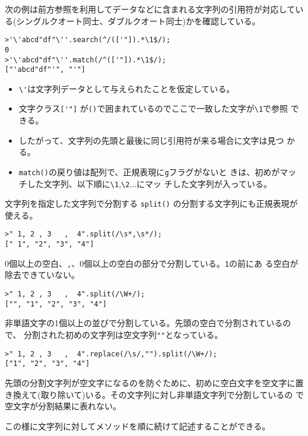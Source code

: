 \begin{Exec}
\iffalse\else
次の例は前方参照を利用してデータなどに含まれる文字列の引用符が対応してい
 る(シングルクオート同士、ダブルクオート同士)かを確認している。
\begin{verbatim}
>'\'abcd"df"\''.search(^/(['"]).*\1$/);
0
>'\'abcd"df"\''.match(/^(['"]).*\1$/);
["'abcd"df"'", "'"]
\end{verbatim}
\begin{itemize}
 \item \verb+\'+は文字列データとして与えられたことを仮定している。
 \item 文字クラス\verb+['"]+%
       が\verb+()+で囲まれているのでここで一致した文字が\verb+\1+で参照
       できる。
 \item したがって、文字列の先頭と最後に同じ引用符が来る場合に文字は見つ
       かる。
 \item \verb+match()+の戻り値は配列で、正規表現に\verb+g+フラグがないと
       きは、初めがマッチした文字列、以下順に\verb+\1+,\verb+\2+...にマッ
       チした文字列が入っている。
\end{itemize}
\fi
\end{Exec}
\begin{Exec}\upshape
 文字列を指定した文字列で分割する \verb+split()+ の分割する文字列にも正規表現が使える。
\begin{verbatim}
>" 1, 2 , 3   ,  4".split(/\s*,\s*/);
[" 1", "2", "3", "4"]
\end{verbatim}
$0$個以上の空白、\verb+,+、$0$個以上の空白の部分で分割している。\verb+1+の前にあ
 る空白が除去できていない。
\begin{verbatim}
>" 1, 2 , 3   ,  4".split(/\W+/);
["", "1", "2", "3", "4"]
\end{verbatim}
非単語文字の1個以上の並びで分割している。先頭の空白で分割されているので、
 分割された初めの文字列は空文字列\verb+""+となっている。
\begin{verbatim}
>" 1, 2 , 3   ,  4".replace(/\s/,"").split(/\W+/);
["1", "2", "3", "4"]
\end{verbatim}
先頭の分割文字列が空文字になるのを防ぐために、初めに空白文字を空文字に置
 き換えて(取り除いて)いる。その文字列に対し非単語文字列で分割しているの
 で空文字が分割結果に表れない。

この様に文字列に対してメソッドを順に続けて記述することができる。
\end{Exec}
